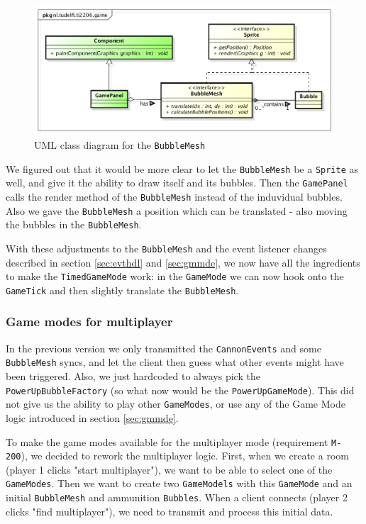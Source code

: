 \documentclass[a4paper]{article}
\begin{document}
\begin{figure}[H]
	\centering
	\includegraphics[scale=0.5]{BubbleMeshSprite.png}
    \caption{UML class diagram for the \texttt{BubbleMesh} }
    \label{fig:bmeshsprite}
\end{figure}

We figured out that it would be more clear to let the \texttt{BubbleMesh} be a \texttt{Sprite} as well, and give it the ability to draw itself and its bubbles. Then the \texttt{GamePanel} calls the render method of the \texttt{BubbleMesh} instead of the induvidual bubbles. Also we gave the \texttt{BubbleMesh} a position which can be translated - also moving the bubbles in the \texttt{BubbleMesh}.

\par{} With these adjustments to the \texttt{BubbleMesh} and the event listener changes described in section \ref{sec:evthdl} and \ref{sec:gmmde}, we now have all the ingredients to make the \texttt{TimedGameMode} work: in the \texttt{GameMode} we can now hook onto the \texttt{GameTick} and then slightly translate the \texttt{BubbleMesh}.

\subsubsection{Game modes for multiplayer}
In the previous version we only transmitted the \texttt{CannonEvents} and some \texttt{BubbleMesh} syncs, and let the client then guess what other events might have been triggered. Also, we just hardcoded to always pick the \texttt{PowerUpBubbleFactory} (so what now would be the \texttt{PowerUpGameMode}). This did not give us the ability to play other \texttt{GameModes}, or use any of the Game Mode logic introduced in section \ref{sec:gmmde}.

\par{}To make the game modes available for the multiplayer mode (requirement \texttt{M-200}), we decided to rework the multiplayer logic. First, when we create a room (player 1 clicks "start multiplayer"), we want to be able to select one of the \texttt{GameModes}. Then we want to create two \texttt{GameModels} with this \texttt{GameMode} and an initial \texttt{BubbleMesh} and ammunition \texttt{Bubbles}. When a client connects (player 2 clicks "find multiplayer"), we need to transmit and process this initial data.
\end{document}
